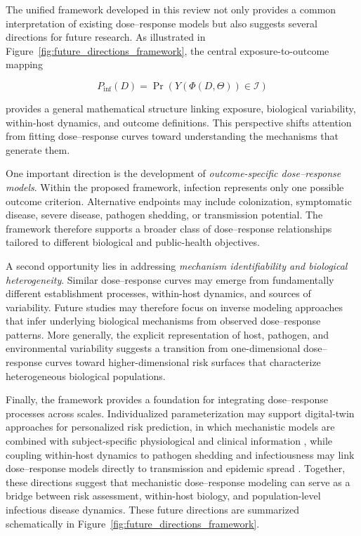 \documentclass[11pt]{article}
\begin{document}
The unified framework developed in this review not only provides a common interpretation of existing dose--response models but also suggests several directions for future research. As illustrated in Figure~\ref{fig:future_directions_framework}, the central exposure-to-outcome mapping

\[
P_{\mathrm{inf}}(D)
=
\Pr\left(Y(\Phi(D,\Theta))\in\mathcal I\right)
\]

provides a general mathematical structure linking exposure, biological variability, within-host dynamics, and outcome definitions. This perspective shifts attention from fitting dose--response curves toward understanding the mechanisms that generate them.

One important direction is the development of \emph{outcome-specific dose--response models}. Within the proposed framework, infection represents only one possible outcome criterion. Alternative endpoints may include colonization, symptomatic disease, severe disease, pathogen shedding, or transmission potential. The framework therefore supports a broader class of dose--response relationships tailored to different biological and public-health objectives.

A second opportunity lies in addressing \emph{mechanism identifiability and biological heterogeneity}. Similar dose--response curves may emerge from fundamentally different establishment processes, within-host dynamics, and sources of variability. Future studies may therefore focus on inverse modeling approaches that infer underlying biological mechanisms from observed dose--response patterns. More generally, the explicit representation of host, pathogen, and environmental variability suggests a transition from one-dimensional dose--response curves toward higher-dimensional risk surfaces that characterize heterogeneous biological populations.

Finally, the framework provides a foundation for integrating dose–response processes across scales. Individualized parameterization may support digital-twin approaches for personalized risk prediction, in which mechanistic models are combined with subject-specific physiological and clinical information \cite{Venkatesh2024DigitalTwins}, while coupling within-host dynamics to pathogen shedding and infectiousness may link dose–response models directly to transmission and epidemic spread \cite{Handel2015CrossingScale,Mideo2008WithinHost}. Together, these directions suggest that mechanistic dose--response modeling can serve as a bridge between risk assessment, within-host biology, and population-level infectious disease dynamics. These future directions are summarized schematically in Figure~\ref{fig:future_directions_framework}.
\end{document}
